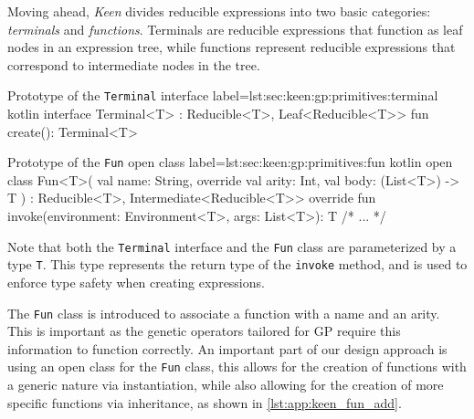     Moving ahead, \textit{Keen} divides reducible expressions into two basic categories: \emph{terminals} and 
    \emph{functions}. Terminals are reducible expressions that function as leaf nodes in an expression tree, while 
    functions represent reducible expressions that correspond to intermediate nodes in the tree.

    \begin{code}{Prototype of the \texttt{Terminal} interface}{
        label=lst:sec:keen:gp:primitives:terminal
    }{kotlin}
        interface Terminal<T> : Reducible<T>, Leaf<Reducible<T>> {
            fun create(): Terminal<T>
        }
    \end{code}

    \begin{code}{Prototype of the \texttt{Fun} open class}{
        label=lst:sec:keen:gp:primitives:fun
    }{kotlin}
        open class Fun<T>(
            val name: String, override val arity: Int, val body: (List<T>) -> T
        ) : Reducible<T>, Intermediate<Reducible<T>> {
            override fun invoke(environment: Environment<T>, args: List<T>): T { /* ... */ }
        }
    \end{code}

    Note that both the \texttt{Terminal} interface and the \texttt{Fun} class are parameterized by a type \texttt{T}. 
    This type represents the return type of the \texttt{invoke} method, and is used to enforce type safety when 
    creating expressions.

    The \texttt{Fun} class is introduced to associate a function with a name and an arity. This is important as the
    genetic operators tailored for GP require this information to function correctly. An important part of our design
    approach is using an open class for the \texttt{Fun} class, this allows for the creation of functions with a generic
    nature via instantiation, while also allowing for the creation of more specific functions via inheritance, as shown
    in \vref{lst:app:keen_fun_add}.
